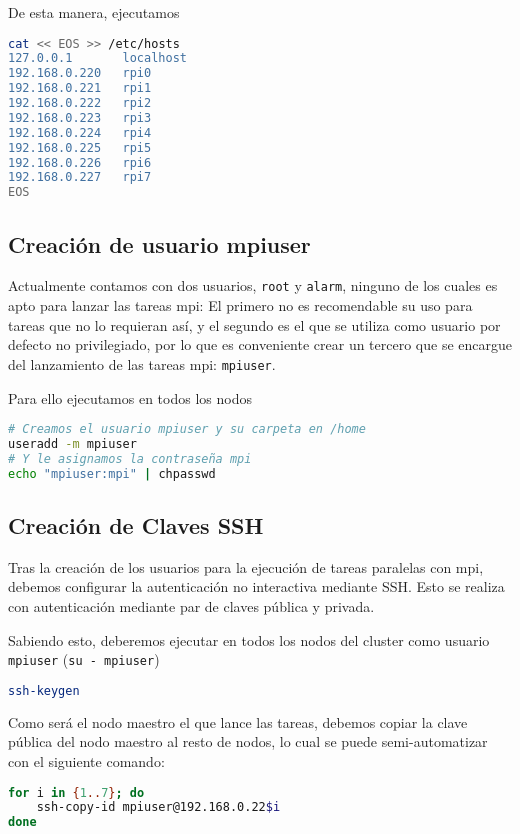 De esta manera, ejecutamos
\begin{lstlisting}[language=bash]
cat << EOS >> /etc/hosts
127.0.0.1       localhost
192.168.0.220   rpi0
192.168.0.221   rpi1
192.168.0.222   rpi2
192.168.0.223   rpi3
192.168.0.224   rpi4
192.168.0.225   rpi5
192.168.0.226   rpi6
192.168.0.227   rpi7
EOS
\end{lstlisting}

\subsection{Creación de usuario mpiuser}
Actualmente contamos con dos usuarios, \texttt{root} y \texttt{alarm}, ninguno de los cuales es apto para lanzar las tareas mpi: El primero no es recomendable su uso para tareas que no lo requieran así, y el segundo es el que se utiliza como usuario por defecto no privilegiado, por lo que es conveniente crear un tercero que se encargue del lanzamiento de las tareas mpi: \texttt{mpiuser}.

Para ello ejecutamos en todos los nodos
\begin{lstlisting}[language=bash]
# Creamos el usuario mpiuser y su carpeta en /home
useradd -m mpiuser
# Y le asignamos la contraseña mpi
echo "mpiuser:mpi" | chpasswd
\end{lstlisting}

\subsection{Creación de Claves SSH}
Tras la creación de los usuarios para la ejecución de tareas paralelas con mpi, debemos configurar la autenticación no interactiva mediante SSH. Esto se realiza con autenticación mediante par de claves pública y privada.

Sabiendo esto, deberemos ejecutar en todos los nodos del cluster como usuario \texttt{mpiuser} (\texttt{su - mpiuser})
\begin{lstlisting}[language=bash]
ssh-keygen
\end{lstlisting}

Como será el nodo maestro el que lance las tareas, debemos copiar la clave pública del nodo maestro al resto de nodos, lo cual se puede semi-automatizar con el siguiente comando:

\begin{lstlisting}[language=bash]
for i in {1..7}; do
    ssh-copy-id mpiuser@192.168.0.22$i
done
\end{lstlisting}

